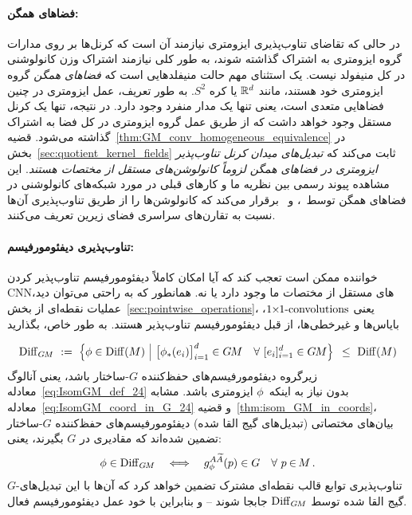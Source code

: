 \paragraph{فضاهای همگن:}
در حالی که تقاضای تناوب‌پذیری ایزومتری نیازمند آن است که کرنل‌ها بر روی مدارات گروه ایزومتری به اشتراک گذاشته شوند، به طور کلی نیازمند اشتراک وزن کانولوشنی در کل منیفولد نیست.
یک استثنای مهم حالت منیفلدهایی است که \emph{فضاهای همگن} گروه ایزومتری خود هستند، مانند $\mathbb{R}^d$ یا کره $S^2$.
به طور تعریف، عمل ایزومتری در چنین فضاهایی متعدی است، یعنی تنها یک مدار منفرد وجود دارد.
در نتیجه، تنها یک کرنل مستقل وجود خواهد داشت که از طریق عمل گروه ایزومتری در کل فضا به اشتراک گذاشته می‌شود.
قضیه~\ref{thm:GM_conv_homogeneous_equivalence} در بخش~\ref{sec:quotient_kernel_fields} ثابت می‌کند که \emph{تبدیل‌های میدان کرنل تناوب‌پذیر ایزومتری در فضاهای همگن لزوماً کانولوشن‌های مستقل از مختصات هستند}.
این مشاهده پیوند رسمی بین نظریه ما و کارهای قبلی در مورد شبکه‌های کانولوشنی در فضاهای همگن
توسط~\citet{Kondor2018-GENERAL}، \citet{Cohen2019-generaltheory} و~\citet{bekkers2020bspline} برقرار می‌کند
که کانولوشن‌ها را از طریق تناوب‌پذیری آن‌ها نسبت به تقارن‌های سراسری فضای زیرین تعریف می‌کنند.






\paragraph{تناوب‌پذیری دیفئومورفیسم:}
خواننده ممکن است تعجب کند که آیا امکان کاملاً دیفئومورفیسم تناوب‌پذیر کردن CNNهای مستقل از مختصات ما وجود دارد یا نه.
همانطور که به راحتی می‌توان دید، عملیات نقطه‌ای از بخش~\ref{sec:pointwise_operations}، یعنی $\mbox{${1\kern-2.65pt\times\kern-3pt1}$-convolutions}$، بایاس‌ها و غیرخطی‌ها، از قبل دیفئومورفیسم تناوب‌پذیر هستند.
به طور خاص، بگذارید

\begin{align}\label{eq:DiffGM_def_part1}
	\DiffGM\ :=\ \pig\{ \phi \in \Diff(M) \ \pig|\ 
	\big[\phi_*(e_i)\big]_{i=1}^d \in \GM \quad \forall\ [e_i]_{i=1}^d \in \GM \pig\} \,\ \leq\ \Diff(M)
\end{align}
زیرگروه دیفئومورفیسم‌های حفظ‌کننده $G$-ساختار باشد، یعنی آنالوگ معادله~\eqref{eq:IsomGM_def_24} بدون نیاز به اینکه~$\phi$ ایزومتری باشد.
مشابه معادله~\eqref{eq:IsomGM_coord_in_G_24} و قضیه~\ref{thm:isom_GM_in_coords}، بیان‌های مختصاتی (تبدیل‌های گیج القا شده) دیفئومورفیسم‌های حفظ‌کننده $G$-ساختار تضمین شده‌اند که مقادیری در $G$ بگیرند، یعنی:
\begin{align}
	\phi \in \operatorname{Diff}_{G\mkern-1.4muM} \quad \Longleftrightarrow \quad g_\phi^{A\widetilde{A}}(p) \in G\ \ \ \forall\ p \mkern-1mu\in\mkern-2mu M \,.
\end{align}
$G$-تناوب‌پذیری توابع قالب نقطه‌ای مشترک تضمین خواهد کرد که آن‌ها با این تبدیل‌های گیج القا شده توسط $\operatorname{Diff}_{G\mkern-1.4muM}$ جابجا شوند -- و بنابراین با خود عمل دیفئومورفیسم فعال.



